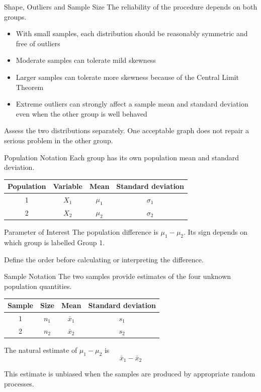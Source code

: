 \documentclass[aspectratio=169,10pt]{beamer}
\begin{document}
\begin{frame}{Shape, Outliers and Sample Size}
The reliability of the procedure depends on both groups.

\begin{itemize}
  \item With small samples, each distribution should be reasonably symmetric and free of outliers
  \item Moderate samples can tolerate mild skewness
  \item Larger samples can tolerate more skewness because of the Central Limit Theorem
  \item Extreme outliers can strongly affect a sample mean and standard deviation even when the other group is well behaved
\end{itemize}

Assess the two distributions separately. One acceptable graph does not repair a serious problem in the other group.
\end{frame}

\begin{frame}{Population Notation}
Each group has its own population mean and standard deviation.

\begin{center}
\begin{tabular}{cccc}
\toprule
\textbf{Population} & \textbf{Variable} & \textbf{Mean} & \textbf{Standard deviation} \\
\midrule
1 & $X_1$ & $\mu_1$ & $\sigma_1$ \\
2 & $X_2$ & $\mu_2$ & $\sigma_2$ \\
\bottomrule
\end{tabular}
\end{center}

\begin{block}{Parameter of Interest}
The population difference is $\mu_1-\mu_2$. Its sign depends on which group is labelled Group 1.
\end{block}

Define the order before calculating or interpreting the difference.
\end{frame}

\begin{frame}{Sample Notation}
The two samples provide estimates of the four unknown population quantities.

\begin{center}
\begin{tabular}{cccc}
\toprule
\textbf{Sample} & \textbf{Size} & \textbf{Mean} & \textbf{Standard deviation} \\
\midrule
1 & $n_1$ & $\bar{x}_1$ & $s_1$ \\
2 & $n_2$ & $\bar{x}_2$ & $s_2$ \\
\bottomrule
\end{tabular}
\end{center}

The natural estimate of $\mu_1-\mu_2$ is
\[
\bar{x}_1-\bar{x}_2
\]

This estimate is unbiased when the samples are produced by appropriate random processes.
\end{frame}
\end{document}
